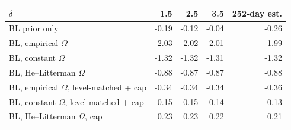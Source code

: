\begin{tabular}{lrrrr}
\toprule
$\delta$ & 1.5 & 2.5 & 3.5 & 252-day est. \\
\midrule
BL prior only & -0.19 & -0.12 & -0.04 & -0.26 \\
BL, empirical $\Omega$ & -2.03 & -2.02 & -2.01 & -1.99 \\
BL, constant $\Omega$ & -1.32 & -1.32 & -1.31 & -1.32 \\
BL, He--Litterman $\Omega$ & -0.88 & -0.87 & -0.87 & -0.88 \\
BL, empirical $\Omega$, level-matched + cap & -0.34 & -0.34 & -0.34 & -0.36 \\
BL, constant $\Omega$, level-matched + cap & 0.15 & 0.15 & 0.14 & 0.13 \\
BL, He--Litterman $\Omega$, cap & 0.23 & 0.23 & 0.22 & 0.21 \\
\bottomrule
\end{tabular}
